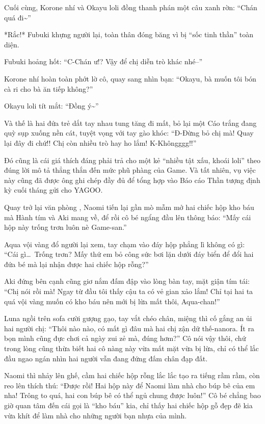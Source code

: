 \documentclass[../main.tex]{subfiles}
\begin{document}
Cuối cùng, Korone nhí và Okayu loli đồng thanh phán một câu xanh rờn: ``Chán quá đi\~{}''

*Rắc!* Fubuki khựng người lại, toàn thân đóng băng vì bị ``sốc tinh thần'' toàn diện.

Fubuki hoảng hốt: ``C-Chán ư!? Vậy để chị diễn trò khác nhé--''

Korone nhí hoàn toàn phớt lờ cô, quay sang nhìn bạn: ``Okayu, bà muốn tôi bón cà ri cho bà ăn tiếp không?''

Okayu loli tít mắt: ``Đồng ý\~{}''

Và thế là hai đứa trẻ dắt tay nhau tung tăng đi mất, bỏ lại một Cáo trắng đang quỳ sụp xuống nền cát, tuyệt vọng với tay gào khóc: ``Đ-Đừng bỏ chị mà! Quay lại đây đi chứ!! Chị còn nhiều trò hay ho lắm! K-Khôngggg!!''

Đó cũng là cái giá thích đáng phải trả cho một kẻ ``nhiều tật xấu, khoái loli'' theo đúng lời mô tả thẳng thắn đến mức phũ phàng của Game. Và tất nhiên, vụ việc này cũng đã được ông ghi chép đầy đủ để tổng hợp vào Báo cáo Thần tượng định kỳ cuối tháng gửi cho YAGOO.

\ct

Quay trở lại văn phòng \hll, Naomi tiến lại gần mò mẫm mở hai chiếc hộp kho báu mà Hành tím và Aki mang về, để rồi cô bé ngẩng đầu lên thông báo: ``Mấy cái hộp này trống trơn luôn nè Game-san.''

Aqua vội vàng đổ người lại xem, tay chạm vào đáy hộp phẳng lì không có gì: ``Cái gì\dots\ Trống trơn? Mấy thứ em bỏ công sức bơi lặn dưới đáy biển để đổi hai đứa bé mà lại nhận được hai chiếc hộp rỗng?''

Aki đứng bên cạnh cũng giơ nắm đấm đập vào lòng bàn tay, mặt giận tím tái: ``Chị nói rồi mà! Ngay từ đầu tôi thấy cậu ta có vẻ gian xảo lắm! Chỉ tại hai ta quá vội vàng muốn có kho báu nên mới bị lừa mất thôi, Aqua-chan!''

Luna ngồi trên sofa cười gượng gạo, tay vắt chéo chân, miệng thì cố gắng an ủi hai người chị: ``Thôi nào nào, có mất gì đâu mà hai chị zận dữ thế-nanora. Ít ra bọn mình cũng đực chơi cả ngày zui zẻ mà, đúng hơm?'' Cô nói vậy thôi, chứ trong lòng cũng thừa biết hai cô nàng này vừa mất mặt vừa bị lừa, chỉ có thể lắc đầu ngao ngán nhìn hai người vẫn đang đứng đấm chân đạp đất.

Naomi thì nhảy lên ghế, cầm hai chiếc hộp rỗng lắc lắc tạo ra tiếng rầm rầm, còn reo lên thích thú: ``Được rồi! Hai hộp này để Naomi làm nhà cho búp bê của em nha! Trông to quá, hai con búp bê có thể ngủ chung được luôn!'' Cô bé chẳng bao giờ quan tâm đến cái gọi là ``kho báu'' kia, chỉ thấy hai chiếc hộp gỗ đẹp đẽ kia vừa khít để làm nhà cho những người bạn nhựa của mình.
\end{document}
